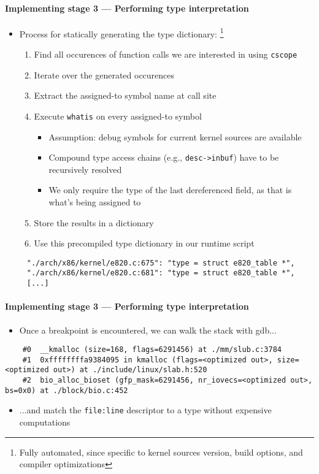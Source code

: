 \documentclass{i20lecture}
\begin{document}
\begin{frame}[fragile]{\insertsection}
  \framesubtitle{Implementing stage 3 --- Performing type interpretation}
    \begin{itemize}
     \item Process for statically generating the type dictionary: \footnote{Fully automated, since specific to kernel sources version, build options, and compiler optimizations}
\pause
     \begin{enumerate}
      \item Find all occurences of function calls we are interested in using \lstinline|cscope|
\pause
      \item Iterate over the generated occurences
\pause
      \item Extract the assigned-to symbol name at call site
\pause
      \item Execute \lstinline|whatis| on every assigned-to symbol
      \begin{itemize}
\pause
       \item Assumption: debug symbols for current kernel sources are available
\pause
       \item Compound type access chains (e.g., \lstinline|desc->inbuf|) have to be recursively resolved
	\pause
	   \item We only require the type of the last dereferenced field, as that is what's being assigned to
      \end{itemize}
\pause
      \item Store the results in a dictionary
\pause
      \item Use this precompiled type dictionary in our runtime script
\pause
     \end{enumerate}
    \end{itemize}
    \begin{lstlisting}
     "./arch/x86/kernel/e820.c:675": "type = struct e820_table *",
     "./arch/x86/kernel/e820.c:681": "type = struct e820_table *",
	 [...]
    \end{lstlisting}
\end{frame}

\begin{frame}[fragile]{\insertsection}
  \framesubtitle{Implementing stage 3 --- Performing type interpretation}
    \begin{itemize}
     \item Once a breakpoint is encountered, we can walk the stack with gdb...
    \end{itemize}
\pause
    \begin{lstlisting}
    #0  __kmalloc (size=168, flags=6291456) at ./mm/slub.c:3784
    #1  0xffffffffa9384095 in kmalloc (flags=<optimized out>, size=<optimized out>) at ./include/linux/slab.h:520
    #2  bio_alloc_bioset (gfp_mask=6291456, nr_iovecs=<optimized out>, bs=0x0) at ./block/bio.c:452
    \end{lstlisting}
\pause
    \begin{itemize}
     \item ...and match the \lstinline|file:line| descriptor to a type without expensive computations
    \end{itemize}
\end{frame}
\end{document}
